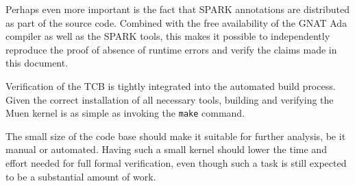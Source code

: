Perhaps even more important is the fact that SPARK annotations are distributed
as part of the source code. Combined with the free availability of the GNAT Ada
compiler as well as the SPARK tools, this makes it possible to independently
reproduce the proof of absence of runtime errors and verify the claims made in
this document.

Verification of the TCB is tightly integrated into the automated build process.
Given the correct installation of all necessary tools, building and verifying
the Muen kernel is as simple as invoking the \texttt{make} command.

The small size of the code base should make it suitable for further analysis, be
it manual or automated. Having such a small kernel should lower the time and
effort needed for full formal verification, even though such a task is still
expected to be a substantial amount of work.
